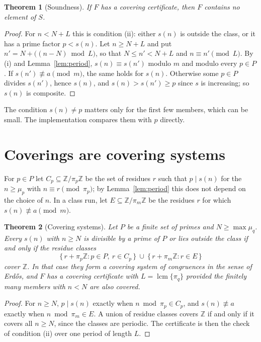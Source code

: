 \documentclass[11pt]{article}
\newtheorem{theorem}{Theorem}
\theoremstyle{definition}
\theoremstyle{remark}
\begin{document}
\begin{theorem}[Soundness]\label{thm:sound}
If $F$ has a covering certificate, then $F$ contains no element of $S$.
\end{theorem}

\begin{proof}
For $n<N+L$ this is condition (ii): either $s(n)$ is outside the class, or it has a prime factor $p<s(n)$. Let $n\ge N+L$ and put $n'=N+\bigl((n-N)\bmod L\bigr)$, so that $N\le n'<N+L$ and $n\equiv n'\pmod L$. By (i) and Lemma~\ref{lem:period}, $s(n)\equiv s(n')$ modulo $m$ and modulo every $p\in P$. If $s(n')\not\equiv a\pmod m$, the same holds for $s(n)$. Otherwise some $p\in P$ divides $s(n')$, hence $s(n)$, and $s(n)>s(n')\ge p$ since $s$ is increasing; so $s(n)$ is composite.
\end{proof}

The condition $s(n)\ne p$ matters only for the first few members, which can be small. The implementation compares them with $p$ directly.

\section{Coverings are covering systems}

For $p\in P$ let $C_p\subseteq\mathbb{Z}/\pi_p\mathbb{Z}$ be the set of residues $r$ such that $p\mid s(n)$ for the $n\ge\mu_p$ with $n\equiv r\pmod{\pi_p}$; by Lemma~\ref{lem:period} this does not depend on the choice of $n$. In a class run, let $E\subseteq\mathbb{Z}/\pi_m\mathbb{Z}$ be the residues $r$ for which $s(n)\not\equiv a\pmod m$.

\begin{theorem}[Covering systems]\label{thm:system}
Let $P$ be a finite set of primes and $N\ge\max\mu_q$. Every $s(n)$ with $n\ge N$ is divisible by a prime of $P$ or lies outside the class if and only if the residue classes
\[
  \{\,r+\pi_p\mathbb{Z} : p\in P,\ r\in C_p\,\}\ \cup\ \{\,r+\pi_m\mathbb{Z} : r\in E\,\}
\]
cover $\mathbb{Z}$. In that case they form a covering system of congruences in the sense of Erd\H{o}s, and $F$ has a covering certificate with $L=\operatorname{lcm}\{\pi_q\}$ provided the finitely many members with $n<N$ are also covered.
\end{theorem}

\begin{proof}
For $n\ge N$, $p\mid s(n)$ exactly when $n\bmod\pi_p\in C_p$, and $s(n)\not\equiv a$ exactly when $n\bmod\pi_m\in E$. A union of residue classes covers $\mathbb{Z}$ if and only if it covers all $n\ge N$, since the classes are periodic. The certificate is then the check of condition (ii) over one period of length $L$.
\end{proof}
\end{document}
